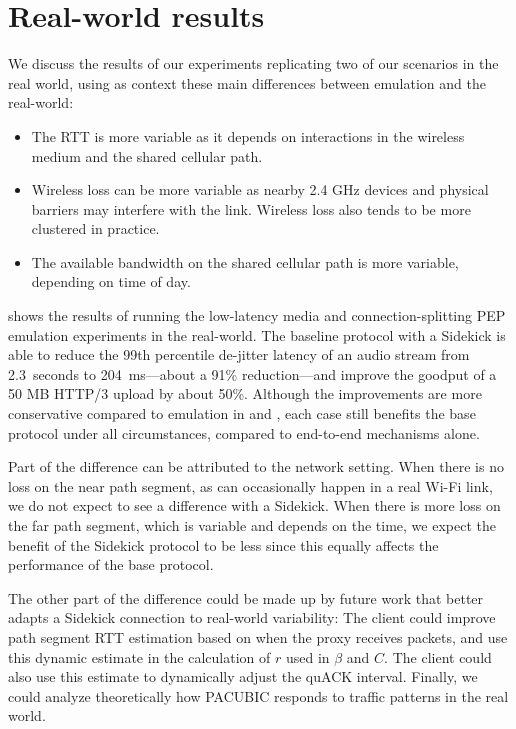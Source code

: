 \section{Real-world results}
\label{sec:sidekick:real-world}



We discuss the results of our experiments replicating two of our scenarios in
the real world, using as context
these main differences between emulation and the real-world:

\begin{itemize}[noitemsep,topsep=0pt]
  \item The RTT is more variable as it depends on interactions in the
  wireless medium and the shared cellular path.
  \item Wireless loss can be more variable as nearby 2.4 GHz devices and
  physical barriers may interfere with the link. Wireless loss also tends
  to be more clustered in practice.
  \item The available bandwidth on the shared cellular path is more variable,
  depending on time of day.
\end{itemize}

 shows the results of running the low-latency
media and connection-splitting PEP emulation experiments in the real-world.
The baseline protocol with a Sidekick is able to
reduce the 99th percentile de-jitter latency of an audio stream
from 2.3~seconds to 204~ms---about a 91\% reduction---and
improve the goodput of a 50 MB HTTP/3 upload by about 50\%.
Although the improvements are more conservative compared to emulation in
 and
, each case still benefits the
base protocol under all circumstances, compared to end-to-end mechanisms alone.

Part of the difference can be attributed to the network setting. When there is
no loss on the near path segment, as can occasionally happen in a real Wi-Fi
link, we do not expect to see a difference with a Sidekick. When there is more
loss on the far path segment, which is variable and depends on the time, we
expect the benefit of the Sidekick protocol to be less since this equally affects the
performance of the base protocol.

The other part of the difference could be made up by future work that better
adapts a Sidekick connection to real-world variability: The client could
improve path segment RTT estimation based on when the proxy receives packets,
and use this dynamic estimate in the calculation of $r$ used in $\beta$ and
$C$. The client could also use this estimate to dynamically adjust the quACK
interval. Finally, we could analyze theoretically how PACUBIC responds to
traffic patterns in the real world.


